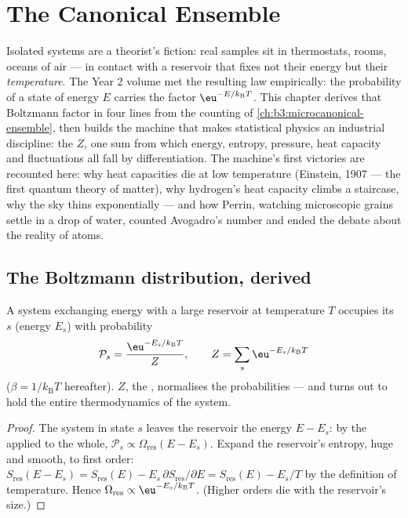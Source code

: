 \chapter{The Canonical Ensemble}\label{ch:b3:canonical-ensemble}

Isolated systems are a theorist's fiction: real samples sit in
thermostats, rooms, oceans of air --- in contact with a reservoir
that fixes not their energy but their \emph{temperature}. The Year 2
volume met the resulting law empirically: the probability of a state
of energy $E$ carries the factor $\eu^{-E/k_{\text{B}}T}$. This
chapter derives that Boltzmann factor in four lines from the
counting of \cref{ch:b3:microcanonical-ensemble}, then builds the
machine that makes statistical physics an industrial discipline: the
\emph{} $Z$, one sum from which energy, entropy,
pressure, heat capacity and fluctuations all fall by
differentiation. The machine's first victories are recounted here:
why heat capacities die at low temperature (Einstein, 1907 --- the
first quantum theory of matter), why hydrogen's heat capacity
climbs a staircase, why the sky thins exponentially --- and how
Perrin, watching microscopic grains settle in a drop of water,
counted Avogadro's number and ended the debate about the reality of
atoms.

\section{The Boltzmann distribution, derived}

\begin{theorem}\label{thm:b3:canonical-ensemble:boltzmann}
A system exchanging energy with a large reservoir at temperature $T$
occupies its  $s$ (energy $E_s$) with probability
\[
\mathcal P_s = \frac{\eu^{-E_s/k_{\text{B}}T}}{Z} , \qquad
Z = \sum_s \eu^{-E_s/k_{\text{B}}T}
\]
($\beta = 1/k_{\text{B}}T$ hereafter). $Z$, the \emph{}, normalises the probabilities --- and turns out to hold
the entire thermodynamics of the system.
\end{theorem}

\begin{proof}
The system in state $s$ leaves the reservoir the energy $E - E_s$:
by the  applied to the whole, $\mathcal P_s
\propto \Omega_{\text{res}}(E - E_s)$. Expand the reservoir's
entropy, huge and smooth, to first order: $S_{\text{res}}(E - E_s)
= S_{\text{res}}(E) - E_s\,\partial S_{\text{res}}/\partial E =
S_{\text{res}}(E) - E_s/T$ by the definition of temperature. Hence
$\Omega_{\text{res}} \propto \eu^{-E_s/k_{\text{B}}T}$. (Higher
orders die with the reservoir's size.)
\end{proof}

